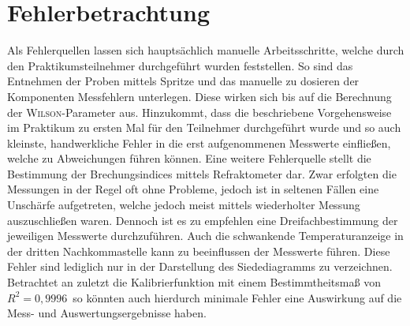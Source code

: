 \section{Fehlerbetrachtung}
\label{sec:fehler}

Als Fehlerquellen lassen sich hauptsächlich manuelle Arbeitsschritte, welche durch den Praktikumsteilnehmer durchgeführt wurden feststellen. So sind das Entnehmen der Proben mittels Spritze und das manuelle zu dosieren der Komponenten Messfehlern unterlegen. Diese wirken sich bis auf die Berechnung der \textsc{Wilson}-Parameter aus. Hinzukommt, dass die beschriebene Vorgehensweise im Praktikum zu ersten Mal für den Teilnehmer durchgeführt wurde und so auch kleinste, handwerkliche Fehler in die erst aufgenommenen Messwerte einfließen, welche zu Abweichungen führen können. Eine weitere Fehlerquelle stellt die Bestimmung der Brechungsindices mittels Refraktometer dar. Zwar erfolgten die Messungen in der Regel oft ohne Probleme, jedoch ist in seltenen Fällen eine Unschärfe aufgetreten, welche jedoch meist mittels wiederholter Messung auszuschließen waren. Dennoch ist es zu empfehlen eine Dreifachbestimmung der jeweiligen Messwerte durchzuführen. Auch die schwankende Temperaturanzeige in der dritten Nachkommastelle kann zu beeinflussen der Messwerte führen. Diese Fehler sind lediglich nur in der Darstellung des Siedediagramms zu verzeichnen. Betrachtet an zuletzt die Kalibrierfunktion mit einem Bestimmtheitsmaß von \mbox{$R^2=0,9996$ }so könnten auch hierdurch minimale Fehler eine Auswirkung auf die Mess- und Auswertungsergebnisse haben.
